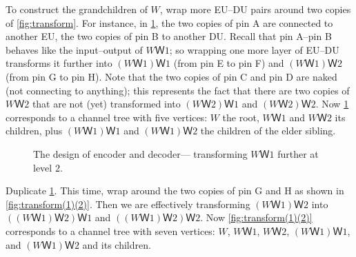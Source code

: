 \documentclass[openany]{amsbook}
\numberwithin{equation}{chapter}
\numberwithin{figure}{chapter}
\numberwithin{table}{chapter}
\theoremstyle{definition}	理dfn:Definition~?s			理exa:Example~?s
\theoremstyle{remark}		理cla:Claim~?s				理rem:Remark~?s
\begin{document}
	To construct the grandchildren of $W$, wrap more
	EU--DU pairs around two copies of \cref{fig:transform}.
	For instance, in \cref{fig:transform(1)}, the two copies of pin A
	are connected to another EU, the two copies of pin B to another DU.
	Recall that pin A--pin B behaves like the input--output of $WＷ1$;
	so wrapping one more layer of EU--DU transforms it further into
	$(WＷ1)Ｗ1$ (from pin E to pin F) and $(WＷ1)Ｗ2$ (from pin G to pin H).
	Note that the two copies of pin C and pin D are naked (not connecting to anything);
	this represents the fact that there are two copies of $WＷ2$
	that are not (yet) transformed into $(WＷ2)Ｗ1$ and $(WＷ2)Ｗ2$.
	Now \cref{fig:transform(1)} corresponds to a channel tree with five vertices:
	$W$ the root, $WＷ1$ and $WＷ2$ its children, plus
	$(WＷ1)Ｗ1$ and $(WＷ1)Ｗ2$ the children of the elder sibling.
	
	\begin{figure}
		\caption{
			The design of encoder and decoder---%
			transforming $WＷ1$ further at level $2$.
		}\label{fig:transform(1)}
	\end{figure}
	
	Duplicate \cref{fig:transform(1)}.
	This time, wrap around the two copies of pin G and H
	as shown in \cref{fig:transform(1)(2)}.
	Then we are effectively transforming $(WＷ1)Ｗ2$
	into $((WＷ1)Ｗ2)Ｗ1$ and $((WＷ1)Ｗ2)Ｗ2$.
	Now \cref{fig:transform(1)(2)} corresponds to a channel tree with seven vertices:
	$W$, $WＷ1$, $WＷ2$, $(WＷ1)Ｗ1$, and $(WＷ1)Ｗ2$ and its children.
	
\end{document}
